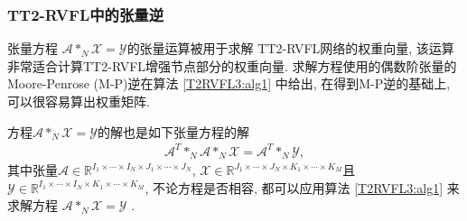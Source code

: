 {%
\subsubsection{TT2-RVFL中的张量逆} \label{Trapezoidsection5-1}
张量方程 $\mathcal A *_N \mathcal X = \mathcal Y$的张量运算被用于求解 TT2-RVFL网络的权重向量,  该运算非常适合计算TT2-RVFL增强节点部分的权重向量.
求解方程使用的偶数阶张量的 Moore-Penrose (M-P)逆在算法 \ref{T2RVFL3:alg1} 中给出, 在得到M-P逆的基础上, 可以很容易算出权重矩阵.
\begin{remark}
方程$\mathcal A *_N \mathcal X = \mathcal Y$的解也是如下张量方程的解
\begin{align}
  \mathcal A^T *_N\mathcal  A *_N \mathcal X = \mathcal A^T *_N \mathcal Y,
\end{align}
其中张量$\mathcal A \in \mathbb R^{I_1\times \cdots\times I_N\times J_1\times \cdots\times J_N} $, $\mathcal X \in \mathbb R^{J_1\times \cdots\times J_N\times K_1\times \cdots\times K_M} $且 $\mathcal Y \in \mathbb R^{I_1\times \cdots\times I_N\times K_1\times \cdots\times K_M} $, 不论方程是否相容, 都可以应用算法 \ref{T2RVFL3:alg1} 来求解方程 $\mathcal  A *_N \mathcal X = \mathcal Y$ \cite{HuangZhao2018NCAA-5838}.
\end{remark}
}
